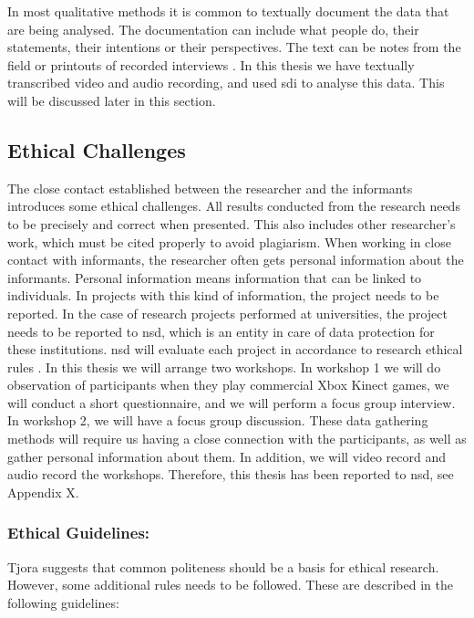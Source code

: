 In most qualitative methods it is common to textually document the data that are being analysed. The documentation can include what people do, their statements, their intentions or their perspectives. The text can be notes from the field or printouts of  recorded interviews \cite{qualitative}. In this thesis we have textually transcribed video and audio recording, and used \ac{sdi} to analyse this data. This will be discussed later in this section.

\subsection{Ethical Challenges}
\label{sec:ethicalchallenges}
The close contact established between the researcher and the informants introduces some ethical challenges. All results conducted from the research needs to be precisely and correct when presented. This also includes other researcher's work, which must be cited properly to avoid plagiarism. When working in close contact with informants, the researcher often gets personal information about the informants. Personal information means information that can be linked to individuals. In projects with this kind of information, the project needs to be reported. In the case of research projects performed at universities, the project needs to be reported to \ac{nsd}, which is an entity in care of data protection for these institutions. \ac{nsd} will evaluate each project in accordance to research ethical rules \cite{qualitative}. In this thesis we will arrange two workshops. In workshop 1 we will do observation of participants when they play commercial Xbox Kinect games, we will conduct a short questionnaire, and we will perform a focus group interview. In workshop 2, we will have a focus group discussion. These data gathering methods will require us having a close connection with the participants, as well as gather personal information about them. In addition, we will video record and audio record the workshops. Therefore, this thesis has been reported to \ac{nsd}, see Appendix X. 

\subsubsection{Ethical Guidelines:}
Tjora \cite{tjora} suggests that common politeness should be a basis for ethical research. However, some additional rules needs to be followed. These are described in the following guidelines:

